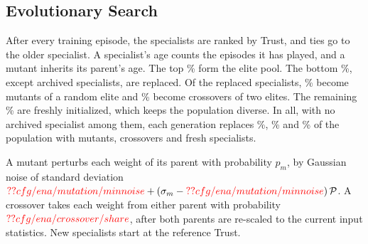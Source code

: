 \subsection{Evolutionary Search}
\label{sec:search}
After every training episode, the specialists are ranked by Trust, and ties go to the older specialist. A specialist's age counts the episodes it has played, and a mutant inherits its parent's age. The top \% form the elite pool. The bottom \%, except archived specialists, are replaced. Of the replaced specialists, \% become mutants of a random elite and \% become crossovers of two elites. The remaining \% are freshly initialized, which keeps the population diverse. In all, with no archived specialist among them, each generation replaces \%, \% and \% of the population with mutants, crossovers and fresh specialists.

A mutant perturbs each weight of its parent with probability $p_m$, by Gaussian noise of standard deviation $\Res{cfg/ena/mutation/minnoise} + (\sigma_m - \Res{cfg/ena/mutation/minnoise})\,\mathcal{P}$. A crossover takes each weight from either parent with probability $\Res{cfg/ena/crossover/share}$, after both parents are re-scaled to the current input statistics. New specialists start at the reference Trust.

